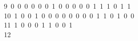 \begin{tabbing}
9\ 0\ 0\ 0\ 0\ 0\ 0\ 1\ 0\ 0\ 0\ 0\ 0\ 1\ 1\ 1\ 0\ 1\ 1\ \\[0pt]
10\ 1\ 0\ 0\ 1\ 0\ 0\ 0\ 0\ 0\ 0\ 0\ 0\ 1\ 1\ 0\ 1\ 0\ 0\ \\[0pt]
11\ 1\ 0\ 0\ 0\ 1\ 1\ 0\ 0\ 1\\[0pt]
12\>\end{tabbing}
